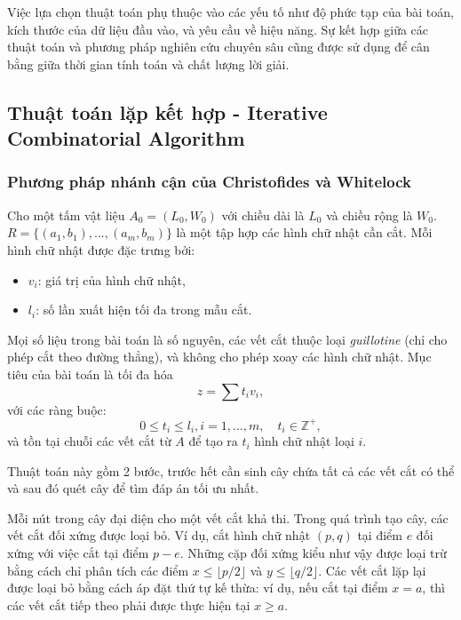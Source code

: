 \documentclass[a4paper]{article}
\begin{document}
\hspace{11pt}
Việc lựa chọn thuật toán phụ thuộc vào các yếu tố như độ phức tạp của bài toán, kích thước của dữ liệu đầu vào, và yêu cầu về hiệu năng. Sự kết hợp giữa các thuật toán và phương pháp nghiên cứu chuyên sâu cũng được sử dụng để cân bằng giữa thời gian tính toán và chất lượng lời giải. 
\subsection{Thuật toán lặp kết hợp - Iterative Combinatorial Algorithm}
\subsubsection{Phương pháp nhánh cận của Christofides và Whitelock}

Cho một tấm vật liệu \( A_0 = (L_0, W_0) \) với chiều dài là \( L_0 \) và chiều rộng là \( W_0 \). \( R = \{(a_1, b_1), ..., (a_m, b_m)\} \) là một tập hợp các hình chữ nhật cần cắt. Mỗi hình chữ nhật được đặc trưng bởi:
\begin{itemize}
    \item \( v_i \): giá trị của hình chữ nhật,
    \item \( l_i \): số lần xuất hiện tối đa trong mẫu cắt.
\end{itemize}

Mọi số liệu trong bài toán là số nguyên, các vết cắt thuộc loại \textit{guillotine} (chỉ cho phép cắt theo đường thẳng), và không cho phép xoay các hình chữ nhật. Mục tiêu của bài toán là tối đa hóa 
\[
z = \sum t_i v_i,
\]
với các ràng buộc:
\[
0 \leq t_i \leq l_i, i = 1,...,m,\quad t_i \in \mathbb{Z}^+, 
\]
và tồn tại chuỗi các vết cắt từ \( A \) để tạo ra \( t_i \) hình chữ nhật loại \( i \).

\hspace{11pt}
Thuật toán này gồm 2 bước, trước hết cần sinh cây chứa tất cả các vết cắt có thể và sau đó quét cây để tìm đáp án tối ưu nhất.

\hspace{11pt}
Mỗi nút trong cây đại diện cho một vết cắt khả thi. Trong quá trình tạo cây, các vết cắt đối xứng được loại bỏ. Ví dụ, cắt hình chữ nhật \( (p, q) \) tại điểm \( e \) đối xứng với việc cắt tại điểm \( p-e \). Những cặp đối xứng kiểu như vậy được loại trừ bằng cách chỉ phân tích các điểm \( x \leq \lfloor p/2 \rfloor \) và \( y \leq \lfloor q/2 \rfloor \). Các vết cắt lặp lại được loại bỏ bằng cách áp đặt thứ tự kế thừa: ví dụ, nếu cắt tại điểm \( x = a \), thì các vết cắt tiếp theo phải được thực hiện tại \( x \geq a \). 
\end{document}
